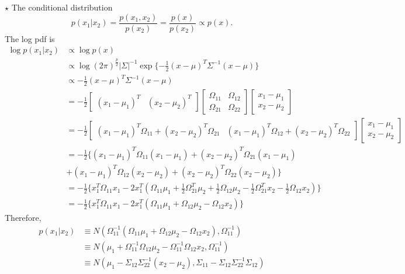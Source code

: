 \documentclass[11pt]{article}
\newcommand{\jie}{$\star$ }
\newcommand{\half}{\frac{1}{2}}
\begin{document}
\begin{enumerate}[(A)]
\bigskip

\jie
The conditional distribution
$$p(x_1|x_2) = \frac{p(x_1,x_2)}{p(x_2)} = \frac{p(x)}{p(x_2)} \propto p(x).$$
The log pdf is
\begin{align*}
    \log p(x_1|x_2) &\propto \log p(x) \\
    &\propto \log (2\pi)^{\frac{p}{2}} |\Sigma|^{-1} \exp \{ -\half (x-\mu)^T \Sigma^{-1} (x-\mu)\} \\
    &\propto -\half (x-\mu)^T\Sigma^{-1} (x-\mu) \\
    &= -\half \begin{bmatrix}
    (x_1-\mu_1)^T & (x_2-\mu_2)^T
    \end{bmatrix}
    \begin{bmatrix}
    \Omega_{11} & \Omega_{12} \\
    \Omega_{21} & \Omega_{22}
    \end{bmatrix}
    \begin{bmatrix}
    x_1-\mu_1 \\
    x_2-\mu_2
    \end{bmatrix} \\
    &= -\half \begin{bmatrix}
    (x_1-\mu_1)^T\Omega_{11} + (x_2-\mu_2)^T\Omega_{21} & (x_1-\mu_1)^T\Omega_{12} + (x_2-\mu_2)^T\Omega_{22}
    \end{bmatrix}
    \begin{bmatrix}
    x_1-\mu_1 \\
    x_2-\mu_2
    \end{bmatrix}\\
    &= -\half \{ (x_1-\mu_1)^T\Omega_{11}(x_1-\mu_1) + (x_2-\mu_2)^T\Omega_{21}(x_1-\mu_1) \\&+ (x_1-\mu_1)^T\Omega_{12}(x_2-\mu_2) + (x_2-\mu_2)^T\Omega_{22}(x_2-\mu_2) \} \\
    &= -\half \{ x_1^T \Omega_{11} x_1 -  2x_1^T (\Omega_{11} \mu_1 + \half \Omega_{21}^T \mu_2 + \half \Omega_{12}\mu_2 - \half \Omega_{21}^T x_2 - \half \Omega_{12}x_2) \} \\
    &= -\half \{ x_1^T \Omega_{11} x_1 -  2x_1^T (\Omega_{11} \mu_1 + \Omega_{12} \mu_2 - \Omega_{12} x_2) \} 
\end{align*}
Therefore,
\begin{align*}
    p(x_1|x_2) &\equiv N(\Omega_{11}^{-1} (\Omega_{11} \mu_1 + \Omega_{12} \mu_2 - \Omega_{12} x_2), \Omega_{11}^{-1}) \\
    &\equiv N(\mu_1 + \Omega_{11}^{-1}\Omega_{12} \mu_2 - \Omega_{11}^{-1}\Omega_{12} x_2, \Omega_{11}^{-1}) \\
    &\equiv N(\mu_1 - \Sigma_{12} \Sigma_{22}^{-1} (x_2 - \mu_2), \Sigma_{11} - \Sigma_{12}\Sigma_{22}^{-1}\Sigma_{12}) 
\end{align*}


\bigskip 

\end{enumerate}
\end{document}
